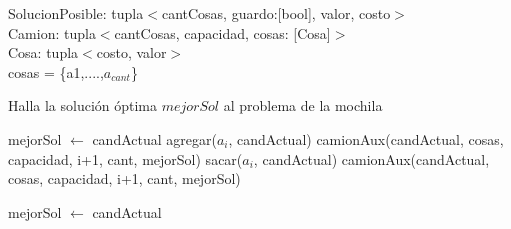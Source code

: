 \noindent
SolucionPosible: tupla$<$cantCosas, guardo:[bool], valor, costo$>$ \\
Camion: tupla$<$cantCosas, capacidad, cosas: [Cosa]$>$ \\
Cosa: tupla$<$costo, valor$>$ \\
cosas = \{a1,....,$a_{cant}$\} \\

\begin{algorithm}
\caption{Halla la solución óptima $mejorSol$ al problema de la mochila}
\begin{algorithmic}[1]
        \STATE mejorSol $\leftarrow$ candActual
    \ELSE
                    \STATE agregar($a_i$, candActual)
                    \STATE camionAux(candActual, cosas, capacidad, i+1, cant, mejorSol)
                    \STATE sacar($a_i$, candActual)
                \ENDIF
            \STATE camionAux(candActual, cosas, capacidad, i+1, cant, mejorSol)

                \STATE mejorSol $\leftarrow$ candActual
            \ENDIF
        \ENDIF
    \ENDIF
\end{algorithmic}
\end{algorithm}
